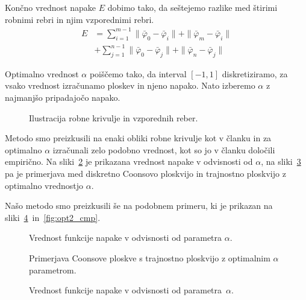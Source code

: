 \documentclass[twocolumn, 10pt]{article}    %
\begin{document}
Končno vrednost napake $E$ dobimo tako, da seštejemo razlike med štirimi robnimi rebri in njim vzporednimi rebri.
\begin{align}
    E &= \sum_{i=1}^{m-1} \| \bar{\varphi}_0 - \bar{\varphi}_i \| + \| \bar{\varphi}_m - \bar{\varphi}_i \|  \\ \nonumber
    &+ \sum_{j=1}^{n-1} \| \bar{\varphi}_0 - \bar{\varphi}_j \| + \| \bar{\varphi}_n - \bar{\varphi}_j \|
\end{align}

Optimalno vrednost $\alpha$ poiščemo tako, da interval $[-1, 1]$ diskretiziramo, za vsako vrednost izračunamo ploskev in njeno napako. Nato izberemo $\alpha$ z najmanjšo pripadajočo napako.

\begin{figure}
    \centering
    \resizebox*{!}{3.5cm}{}
    \caption{Ilustracija robne krivulje in vzporednih reber.}
    \label{fig:rebra}
\end{figure}

Metodo smo preizkusili na enaki obliki robne krivulje kot v članku \cite{FARIN1999691} in za optimalno $\alpha$ izračunali zelo podobno vrednost, kot so jo v članku določili empirično. 
Na sliki~\ref{fig:opt1_alpha} je prikazana vrednost napake v odvisnosti od $\alpha$, na sliki~\ref{fig:opt1_cmp} pa je primerjava med diskretno Coonsovo ploskvijo in trajnostno ploskvijo z optimalno vrednostjo $\alpha$.

Našo metodo smo preizkusili še na podobnem primeru, ki je prikazan na sliki~\ref{fig:opt2_alpha}~in~\ref{fig:opt2_cmp}.



\begin{figure}
    \centering
    \resizebox*{!}{6cm}{}
    \caption{Vrednost funkcije napake v odvisnosti od parametra $\alpha$.}
    \label{fig:opt1_alpha}
\end{figure}

\begin{figure}
    \centering
    \resizebox*{!}{3.5cm}{}
    \caption{Primerjava Coonsove ploskve s trajnostno ploskvijo z optimalnim $\alpha$ parametrom.}
    \label{fig:opt1_cmp}
\end{figure}

\begin{figure}
    \centering
    \resizebox*{!}{6cm}{}
    \caption{Vrednost funkcije napake v odvisnosti od parametra~$\alpha$.}
    \label{fig:opt2_alpha}
\end{figure}
\end{document}
